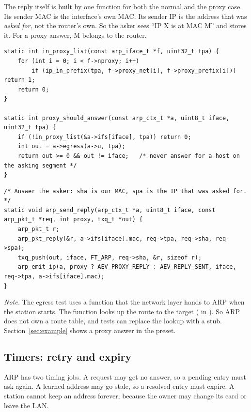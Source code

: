 The reply itself is built by one function for both the normal and the proxy case. Its sender MAC is the interface's own MAC. Its sender IP is the address that was \emph{asked for}, not the router's own. So the asker sees ``IP X is at MAC M'' and stores it. For a proxy answer, M belongs to the router.

\begin{lstlisting}[style=corelst, firstnumber=33, caption={\code{src/arp.c}, lines 33--43: the proxy decision.}]
static int in_proxy_list(const arp_iface_t *f, uint32_t tpa) {
    for (int i = 0; i < f->nproxy; i++)
        if (ip_in_prefix(tpa, f->proxy_net[i], f->proxy_prefix[i])) return 1;
    return 0;
}

static int proxy_should_answer(const arp_ctx_t *a, uint8_t iface, uint32_t tpa) {
    if (!in_proxy_list(&a->ifs[iface], tpa)) return 0;
    int out = a->egress(a->u, tpa);
    return out >= 0 && out != iface;   /* never answer for a host on the asking segment */
}
\end{lstlisting}

\begin{lstlisting}[style=corelst, firstnumber=78, caption={\code{src/arp.c}, lines 78--84: the reply carries our MAC and the asked-for IP.}]
/* Answer the asker: sha is our MAC, spa is the IP that was asked for. */
static void arp_send_reply(arp_ctx_t *a, uint8_t iface, const arp_pkt_t *req, int proxy, txq_t *out) {
    arp_pkt_t r;
    arp_pkt_reply(&r, a->ifs[iface].mac, req->tpa, req->sha, req->spa);
    txq_push(out, iface, FT_ARP, req->sha, &r, sizeof r);
    arp_emit_ip(a, proxy ? AEV_PROXY_REPLY : AEV_REPLY_SENT, iface, req->tpa, a->ifs[iface].mac);
}
\end{lstlisting}

\emph{Note.} The egress test uses a function that the network layer hands to ARP when the station starts. The function looks up the route to the target ( in ). So ARP does not own a route table, and tests can replace the lookup with a stub. Section~\ref{sec:example} shows a proxy answer in the  preset.

\subsection{Timers: retry and expiry}\label{sec:core-timers}
ARP has two timing jobs. A request may get no answer, so a pending entry must ask again. A learned address may go stale, so a resolved entry must expire. A station cannot keep an address forever, because the owner may change its card or leave the LAN.

